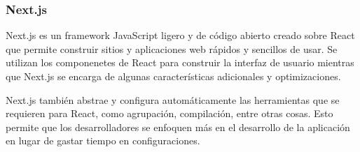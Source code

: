 \subsubsection{Next.js}
Next.js es un framework JavaScript ligero y de código abierto creado sobre React que permite construir sitios y aplicaciones web rápidos y sencillos de usar. Se utilizan los componenetes de React para construir la interfaz de usuario mientras que Next.js se encarga de algunas características adicionales y optimizaciones.

Next.js también abstrae y configura automáticamente las herramientas que se requieren para React, como agrupación, compilación, entre otras cosas. Esto permite que los desarrolladores se enfoquen más en el desarrollo de la aplicación en lugar de gastar tiempo en configuraciones.